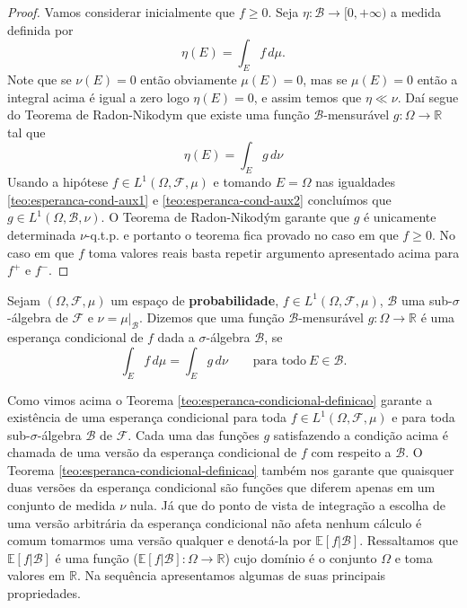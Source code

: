 \begin{proof}
Vamos considerar inicialmente que $f\geq 0$. 
Seja $\eta:\mathcal{B}\to[0,+\infty)$ a medida definida por 
\begin{equation}\label{teo:esperanca-cond-aux1}
\eta(E)=\int_{E} f\, d\mu.
\end{equation}
Note que se $\nu(E)=0$ então obviamente 
$\mu(E)=0$, mas se $\mu(E)=0$ então a integral 
acima é igual a zero logo
$\eta(E)=0$, e assim temos que $\eta\ll\nu$. 
Daí segue do Teorema de Radon-Nikodym que existe uma função 
$\mathcal{B}$-mensurável $g:\Omega\to\mathbb{R}$ tal que 
\begin{equation}
\label{teo:esperanca-cond-aux2}
\eta(E)=\int_{E} g\, d\nu
\end{equation}
Usando a hipótese $f\in L^1(\Omega,\mathcal{F},\mu)$ 
e tomando $E=\Omega$ nas igualdades 
\eqref{teo:esperanca-cond-aux1} e \eqref{teo:esperanca-cond-aux2} 
concluímos que $g\in L^1(\Omega,\mathcal{B},\nu)$. 
O Teorema de Radon-Nikodým garante que $g$ é 
unicamente determinada $\nu$-q.t.p. 
e portanto o teorema fica provado no caso em que $f\geq 0$.
No caso em que $f$ toma valores reais basta 
repetir argumento apresentado acima para $f^{+}$ e $f^{-}$.
\end{proof}




\begin{definicao} 
Sejam $(\Omega,\mathcal{F},\mu)$ um espaço de {\bf probabilidade}, 
$f\in L^1(\Omega,\mathcal{F},\mu)$, $\mathcal{B}$ 
uma sub-$\sigma$-álgebra de $\mathcal{F}$ e $\nu=\mu|_{\mathcal{B}}$. 
Dizemos que uma função $\mathcal{B}$-mensurável 
$g:\Omega\to\mathbb{R}$ é uma esperança condicional
de $f$ dada a $\sigma$-álgebra $\mathcal{B}$, se 
\[
\int_{E} f\, d\mu 
=
\int_{E} g\, d\nu \qquad \text{para todo} 
\ E\in\mathcal{B}.
\]
\end{definicao}

Como vimos acima o 
Teorema \eqref{teo:esperanca-condicional-definicao} 
garante a existência de uma esperança condicional para toda 
$f\in L^1(\Omega,\mathcal{F},\mu)$ e para toda 
sub-$\sigma$-álgebra $\mathcal{B}$ de $\mathcal{F}$. 
Cada uma das funções $g$ satisfazendo 
a condição acima é chamada de uma versão da esperança 
condicional de $f$ com respeito a $\mathcal{B}$. 
O Teorema \eqref{teo:esperanca-condicional-definicao} 
também nos garante que quaisquer duas 
versões da esperança condicional 
são funções que diferem apenas em um conjunto de medida $\nu$ nula. 
Já que do ponto de vista de integração 
a escolha de uma versão arbitrária da esperança condicional 
não afeta nenhum cálculo é comum tomarmos uma versão qualquer
e denotá-la por $\mathbb{E}[f|\mathcal{B}]$. 
Ressaltamos que $\mathbb{E}[f|\mathcal{B}]$ 
é uma função ($\mathbb{E}[f|\mathcal{B}]:\Omega\to\mathbb{R}$) 
cujo domínio é o conjunto $\Omega$ 
e toma valores em $\mathbb{R}$. 
Na sequência apresentamos algumas de suas principais propriedades.



